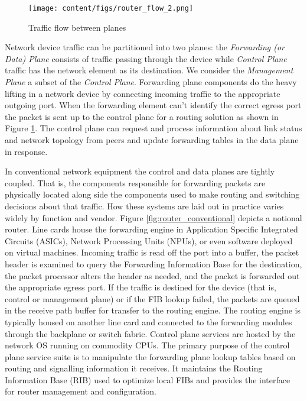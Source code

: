 \begin{figure}[ht]
\centering
\texttt{[image: content/figs/router\_flow\_2.png]}
\caption{Traffic flow between planes}
\label{fig:router_flow}
\end{figure} 
Network device traffic can be partitioned into two planes\cite{Khosravi_Anderson_2003}: the \textit{Forwarding (or Data) Plane} consists of traffic passing through the device while \textit{Control Plane} traffic has the network element as its destination. We consider the \textit{Management Plane} a subset of the \textit{Control Plane}. Forwarding plane components do the heavy lifting in a network device by connecting incoming traffic to the appropriate outgoing port. When the forwarding element can't identify the correct egress port the packet is sent up to the control plane for a routing solution as shown in Figure \ref{fig:router_flow}. The control plane can request and process information about link status and network topology from peers and update forwarding tables in the data plane in response. 

In conventional network equipment the control and data planes are tightly coupled. That is, the components responsible for forwarding packets are physically located along side the components used to make routing and switching decisions about that traffic. How these systems are laid out in practice varies widely by function and vendor. Figure \ref{fig:router_conventional} depicts a notional router. Line cards house the forwarding engine in Application Specific Integrated Circuits (ASICs), Network Processing Units (NPUs), or even software deployed on virtual machines. Incoming traffic is read off the port into a buffer, the packet header is examined to query the Forwarding Information Base for the destination, the packet processor alters the header as needed, and the packet is forwarded out the appropriate egress port. If the traffic is destined for the device (that is, control or management plane) or if the FIB lookup failed, the packets are queued in the receive path buffer for transfer to the routing engine. The routing engine is typically housed on another line card and connected to the forwarding modules through the backplane or switch fabric. Control plane services are hosted by the network OS running on commodity CPUs. The primary purpose of the control plane service suite is to manipulate the forwarding plane lookup tables based on routing and signalling information it receives. It maintains the Routing Information Base (RIB) used to optimize local FIBs and provides the interface for router management and configuration. 


